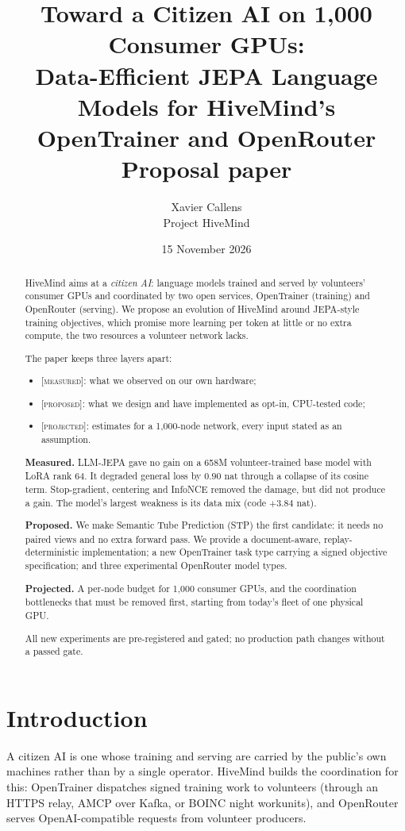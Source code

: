 \documentclass[11pt]{article}
\title{Toward a Citizen AI on 1{,}000 Consumer GPUs:\\
Data-Efficient JEPA Language Models for HiveMind's OpenTrainer and OpenRouter\\
\large Proposal paper}
\author{Xavier Callens\\ \small Project HiveMind}
\date{15 November 2026}
\newcommand{\measured}{\textnormal{\textsc{[measured]}}}
\newcommand{\proposed}{\textnormal{\textsc{[proposed]}}}
\newcommand{\projected}{\textnormal{\textsc{[projected]}}}
\begin{document}
\maketitle

\begin{abstract}
HiveMind aims at a \emph{citizen AI}: language models trained and served by volunteers' consumer GPUs and coordinated
by two open services, OpenTrainer (training) and OpenRouter (serving). We propose an evolution of HiveMind around
JEPA-style training objectives, which promise more learning per token at little or no extra compute, the two resources
a volunteer network lacks.

The paper keeps three layers apart:
\begin{itemize}
\item \measured: what we observed on our own hardware;
\item \proposed: what we design and have implemented as opt-in, CPU-tested code;
\item \projected: estimates for a 1{,}000-node network, every input stated as an assumption.
\end{itemize}

\textbf{Measured.} LLM-JEPA gave no gain on a 658M volunteer-trained base model with LoRA rank 64. It degraded general
loss by $0.90$ nat through a collapse of its cosine term. Stop-gradient, centering and InfoNCE removed the damage, but
did not produce a gain. The model's largest weakness is its data mix (code $+3.84$ nat).

\textbf{Proposed.} We make Semantic Tube Prediction (STP) the first candidate: it needs no paired views and no extra
forward pass. We provide a document-aware, replay-deterministic implementation; a new OpenTrainer task type carrying a
signed objective specification; and three experimental OpenRouter model types.

\textbf{Projected.} A per-node budget for 1{,}000 consumer GPUs, and the coordination bottlenecks that must be removed
first, starting from today's fleet of one physical GPU.

All new experiments are pre-registered and gated; no production path changes without a passed gate.
\end{abstract}

\section{Introduction}
A citizen AI is one whose training and serving are carried by the public's own machines rather than by a single
operator. HiveMind builds the coordination for this: OpenTrainer dispatches signed training work to volunteers (through
an HTTPS relay, AMCP over Kafka, or BOINC night workunits), and OpenRouter serves OpenAI-compatible requests from
volunteer producers.
\end{document}
